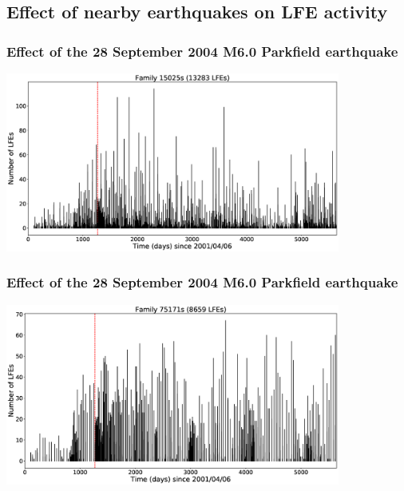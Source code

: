 \documentclass{beamer}
\begin{document}

	\subsection{Effect of nearby earthquakes on LFE activity}

	\begin{frame}
		\frametitle{Effect of the 28 September 2004 M6.0 Parkfield earthquake}
		\begin{center}
			\includegraphics[width=11cm, trim={0cm 0cm 0cm 0cm}, clip]{LFE_catalogs/15025s_Parkfield.eps}
		\end{center}
	\end{frame}

	\begin{frame}
		\frametitle{Effect of the 28 September 2004 M6.0 Parkfield earthquake}
		\begin{center}
			\includegraphics[width=11cm, trim={0cm 0cm 0cm 0cm}, clip]{LFE_catalogs/75171s_Parkfield.eps}
		\end{center}
	\end{frame}
\end{document}
